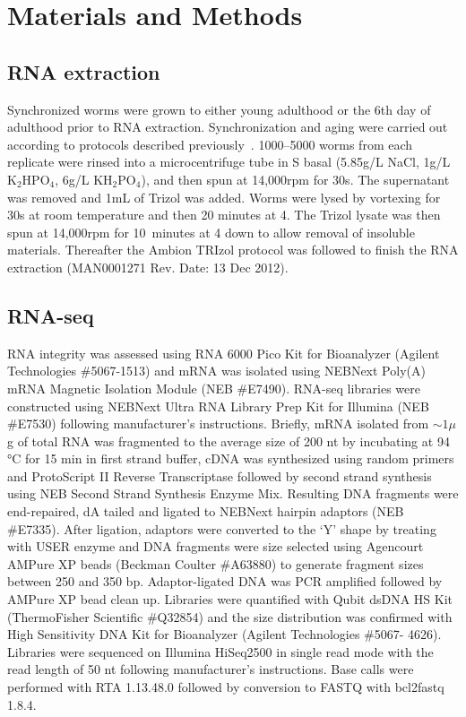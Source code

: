 \documentclass[9pt,twocolumn,twoside]{gsag3jnl}
\begin{document}
\section{Materials and Methods}
\label{sec:materials_methods}

\subsection{RNA extraction}
\label{sb:rna_extraction}
Synchronized worms were grown to either young adulthood or the 6th day of adulthood prior to RNA extraction. Synchronization and aging were carried out according to protocols described previously~\citep{Leighton2014}. 1000--5000 worms from each replicate were rinsed into a microcentrifuge tube in S basal (5.85g/L NaCl, 1g/L $\mathrm{K}_2\mathrm{HPO}_4$, 6g/L $\mathrm{KH}_2\mathrm{PO}_4$), and then spun at 14,000rpm for 30s. The supernatant was removed and 1mL of Trizol was added. Worms were lysed by vortexing for 30s at room temperature and then 20 minutes at 4\degree. The Trizol lysate was then spun at 14,000rpm for 10~minutes at 4\degree{} down to allow removal of insoluble materials. Thereafter the Ambion TRIzol protocol was followed to finish the RNA extraction (MAN0001271 Rev. Date: 13 Dec 2012).

\subsection{RNA-seq}
\label{sb:rna_seq}

RNA integrity was assessed using RNA 6000 Pico Kit for Bioanalyzer (Agilent Technologies \#5067-1513) and mRNA was isolated using NEBNext Poly(A) mRNA Magnetic Isolation Module (NEB \#E7490). RNA-seq libraries were constructed using NEBNext Ultra RNA Library Prep Kit for Illumina (NEB \#E7530) following manufacturer’s instructions. Briefly, mRNA isolated from $\sim1\mu$g of total RNA was fragmented to the average size of 200 nt by incubating at 94 °C for 15 min in first strand buffer, cDNA was synthesized using random primers and ProtoScript II Reverse Transcriptase followed by second strand synthesis using NEB Second Strand Synthesis Enzyme Mix. Resulting DNA fragments were end-repaired, dA tailed and ligated to NEBNext hairpin adaptors (NEB \#E7335).
After ligation, adaptors were converted to the ‘Y’ shape by treating with USER enzyme and DNA fragments were size selected using Agencourt AMPure XP beads (Beckman Coulter \#A63880) to generate fragment sizes between 250 and 350 bp. Adaptor-ligated DNA was PCR amplified followed by AMPure XP bead clean up. Libraries were quantified with Qubit dsDNA HS Kit (ThermoFisher Scientific \#Q32854) and the size distribution was confirmed with High Sensitivity DNA Kit for Bioanalyzer (Agilent Technologies \#5067- 4626).
Libraries were sequenced on Illumina HiSeq2500 in single read mode with the read length of 50 nt following manufacturer's instructions. Base calls were performed with RTA 1.13.48.0 followed by conversion to FASTQ with bcl2fastq 1.8.4.
\end{document}
